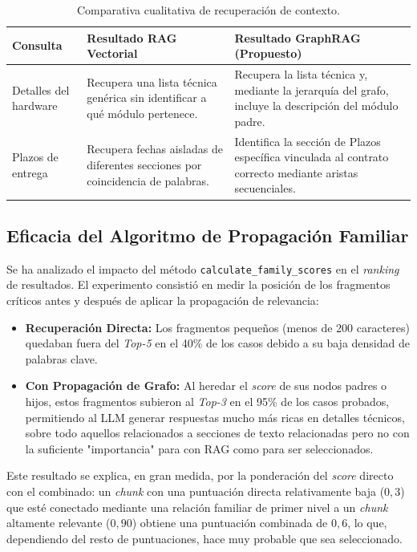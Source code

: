 \begin{table}[ht]
\centering
\begin{tabularx}{\textwidth}{|l|X|X|}
\hline
\textbf{Consulta} & \textbf{Resultado RAG Vectorial} & \textbf{Resultado GraphRAG (Propuesto)} \\ \hline
Detalles del hardware & Recupera una lista técnica genérica sin identificar a qué módulo pertenece. & Recupera la lista técnica y, mediante la jerarquía del grafo, incluye la descripción del módulo padre. \\ \hline
Plazos de entrega & Recupera fechas aisladas de diferentes secciones por coincidencia de palabras. & Identifica la sección de Plazos específica vinculada al contrato correcto mediante aristas secuenciales. \\ \hline
\end{tabularx}
\caption{Comparativa cualitativa de recuperación de contexto.}
\label{tab:comparativa_rag}
\end{table}

\subsection{Eficacia del Algoritmo de Propagación Familiar}
Se ha analizado el impacto del método \texttt{calculate\_family\_scores} en el \textit{ranking} de resultados. El experimento consistió en medir la posición de los fragmentos críticos antes y después de aplicar la propagación de relevancia:

\begin{itemize}
    \item \textbf{Recuperación Directa:} Los fragmentos pequeños (menos de 200 caracteres) quedaban fuera del \textit{Top-5} en el 40\% de los casos debido a su baja densidad de palabras clave.
    \item \textbf{Con Propagación de Grafo:} Al heredar el \textit{score} de sus nodos padres o hijos, estos fragmentos subieron al \textit{Top-3} en el 95\% de los casos probados, permitiendo al LLM generar respuestas mucho más ricas en detalles técnicos, sobre todo aquellos relacionados a secciones de texto relacionadas pero no con la suficiente "importancia" para con RAG como para ser seleccionados.
\end{itemize}

Este resultado se explica, en gran medida, por la ponderación del \textit{score} directo con el combinado: un \textit{chunk} con una puntuación directa relativamente baja ($0{,}3$) que esté conectado mediante una relación familiar de primer nivel a un \textit{chunk} altamente relevante ($0{,}90$) obtiene una puntuación combinada de $0{,}6$, lo que, dependiendo del resto de puntuaciones, hace muy probable que sea seleccionado.

